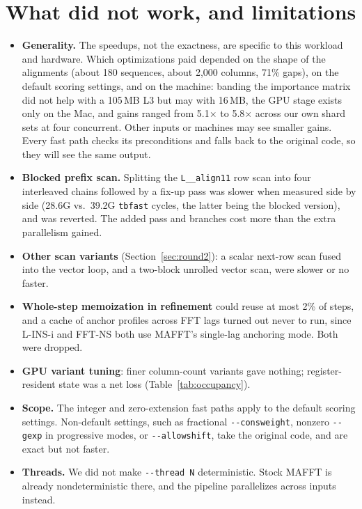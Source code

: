 \documentclass[11pt]{article}
\newcommand{\code}[1]{\texttt{#1}}
\begin{document}
\section{What did not work, and limitations}

\begin{itemize}
\item \textbf{Generality.} The speedups, not the exactness, are specific to this workload and
  hardware. Which optimizations paid depended on the shape of the alignments (about 180
  sequences, about 2{,}000 columns, 71\% gaps), on the default scoring settings, and on the
  machine: banding the importance matrix did not help with a 105\,MB L3 but may with 16\,MB,
  the GPU stage exists only on the Mac, and gains ranged from 5.1$\times$ to 5.8$\times$ across
  our own shard sets at four concurrent. Other inputs or machines may see smaller gains. Every
  fast path checks its preconditions and falls back to the original code, so they will see
  the same output.
\item \textbf{Blocked prefix scan.} Splitting the \code{L\_\_align11} row scan into four
  interleaved chains followed by a fix-up pass was slower when measured side by side
  (28.6G vs.\ 39.2G \code{tbfast} cycles, the latter being the blocked version), and was
  reverted. The added pass and branches cost more than the extra parallelism gained.
\item \textbf{Other scan variants} (Section~\ref{sec:round2}): a scalar next-row scan fused into
  the vector loop, and a two-block unrolled vector scan, were slower or no faster.
\item \textbf{Whole-step memoization in refinement} could reuse at most 2\% of steps, and a
  cache of anchor profiles across FFT lags turned out never to run, since L-INS-i and
  FFT-NS both use MAFFT's single-lag anchoring mode. Both were dropped.
\item \textbf{GPU variant tuning}: finer column-count variants gave nothing; register-resident
  state was a net loss (Table~\ref{tab:occupancy}).
\item \textbf{Scope.} The integer and zero-extension fast paths apply to the default
  scoring settings. Non-default settings, such as fractional \code{-{}-consweight},
  nonzero \code{-{}-gexp} in progressive modes, or \code{-{}-allowshift}, take the original
  code, and are exact but not faster.
\item \textbf{Threads.} We did not make \code{-{}-thread N} deterministic. Stock MAFFT is
  already nondeterministic there, and the pipeline parallelizes across inputs instead.

\end{itemize}
\end{document}
